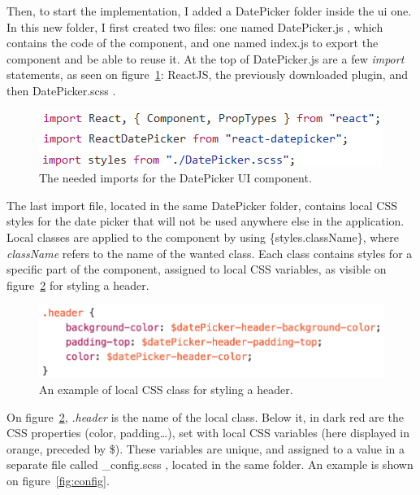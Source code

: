 Then, to start the implementation, I added a \guillemotleft{} DatePicker \guillemotright{} folder inside the \guillemotleft{} ui \guillemotright{} one. In this new folder, I first created two files: one named \guillemotleft{} DatePicker.js \guillemotright{}, which contains the code of the component, and one named \guillemotleft{} index.js \guillemotright{} to export the component and be able to reuse it. At the top of DatePicker.js are a few \textit{import} statements, as seen on {\sc figure}~\ref{fig:imports}: ReactJS, the previously downloaded plugin, and then \guillemotleft{} DatePicker.scss \guillemotright{}.

\begin{figure}[H]
    \centering
    \includegraphics{figure/imports.png}
    \caption{The needed imports for the DatePicker UI component.}
    \label{fig:imports}
\end{figure}

The last import file, located in the same \guillemotleft{} DatePicker \guillemotright{} folder, contains local CSS styles for the date picker that will not be used anywhere else in the application. Local classes are applied to the component by using \{styles.className\}, where \textit{className} refers to the name of the wanted class. Each class contains styles for a specific part of the component, assigned to local CSS variables, as visible on {\sc figure}~\ref{fig:cssClass} for styling a header.

\begin{figure}[H]
    \centering
    \includegraphics[scale=0.6]{figure/cssClass.png}
    \caption{An example of local CSS class for styling a header.}
    \label{fig:cssClass}
\end{figure}

On {\sc figure}~\ref{fig:cssClass}, \textit{.header} is the name of the local class. Below it, in dark red are the CSS properties (color, padding\ldots), set with local CSS variables (here displayed in orange, preceded by \$). These variables are unique, and assigned to a value in a separate file called \guillemotleft{} \_config.scss \guillemotright{}, located in the same folder. An example is shown on {\sc figure}~\ref{fig:config}.

